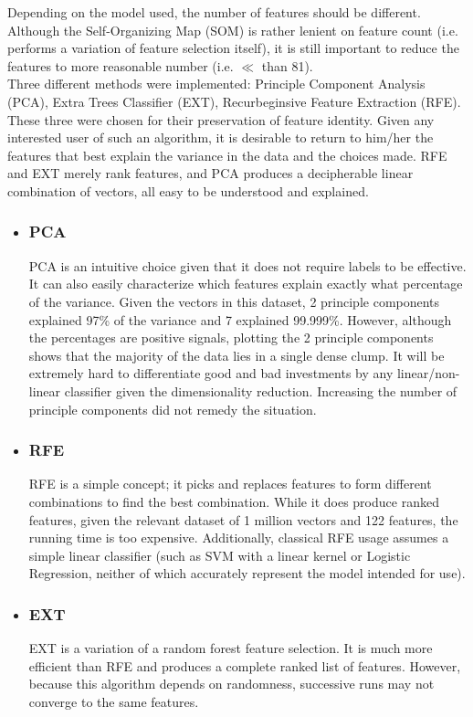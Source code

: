 \documentclass[preprint,12pt]{elsarticle}
\begin{document}
Depending on the model used, the number of features should be different. Although the Self-Organizing Map (SOM) is rather lenient on feature count (i.e. performs a variation of feature selection itself), it is still important to reduce the features to more reasonable number (i.e. $\ll$ than 81).\\

Three different methods were implemented: Principle Component Analysis (PCA), Extra Trees Classifier (EXT), Recurbeginsive Feature Extraction (RFE). These three were chosen for their preservation of feature identity. Given any interested user of such an algorithm, it is desirable to return to him/her the features that best explain the variance in the data and the choices made. RFE and EXT merely rank features, and PCA produces a decipherable linear combination of vectors, all easy to be understood and explained.

\begin{itemize}
	\item \subsubsection{PCA} PCA is an intuitive choice given that it does not require labels to be effective. It can also easily characterize which features explain exactly what percentage of the variance. Given the vectors in this dataset, 2 principle components explained 97\% of the variance and 7 explained 99.999\%. However, although the percentages are positive signals, plotting the 2 principle components shows that the majority of the data lies in a single dense clump. It will be extremely hard to differentiate good and bad investments by any linear/non-linear classifier given the dimensionality reduction. Increasing the number of principle components did not remedy the situation. 
    \item \subsubsection{RFE} RFE is a simple concept; it picks and replaces features to form different combinations to find the best combination. While it does produce ranked features, given the relevant dataset of 1 million vectors and 122 features, the running time is too expensive. Additionally, classical RFE usage assumes a simple linear classifier (such as SVM with a linear kernel or Logistic Regression, neither of which accurately represent the model intended for use).  
    \item \subsubsection{EXT} EXT is a variation of a random forest feature selection. It is much more efficient than RFE and produces a complete ranked list of features. However, because this algorithm depends on randomness, successive runs may not converge to the same features. 
\end{itemize}
\end{document}
